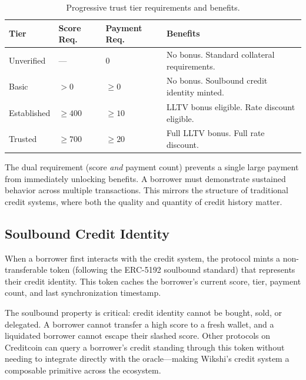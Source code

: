 \documentclass[11pt,a4paper]{article}
\begin{document}
\begin{table}[H]
\centering
{}
\begin{tabularx}{\textwidth}{l C{2.2cm} C{2.2cm} X}
\toprule
\textbf{Tier} & \textbf{Score Req.} & \textbf{Payment Req.} & \textbf{Benefits} \\
\midrule
Unverified & --- & 0 & No bonus. Standard collateral requirements. \\
Basic & $>0$ & $\geq 0$ & No bonus. Soulbound credit identity minted. \\
Established & $\geq 400$ & $\geq 10$ & LLTV bonus eligible. Rate discount eligible. \\
Trusted & $\geq 700$ & $\geq 20$ & Full LLTV bonus. Full rate discount. \\
\bottomrule
\end{tabularx}
\caption{Progressive trust tier requirements and benefits.}
\label{tab:tiers}
\end{table}

The dual requirement (score \emph{and} payment count) prevents a single large payment from immediately unlocking benefits. A borrower must demonstrate sustained behavior across multiple transactions. This mirrors the structure of traditional credit systems, where both the quality and quantity of credit history matter.

\subsection{Soulbound Credit Identity}

When a borrower first interacts with the credit system, the protocol mints a non-transferable token (following the ERC-5192 soulbound standard) that represents their credit identity. This token caches the borrower's current score, tier, payment count, and last synchronization timestamp.

The soulbound property is critical: credit identity cannot be bought, sold, or delegated. A borrower cannot transfer a high score to a fresh wallet, and a liquidated borrower cannot escape their slashed score. Other protocols on Creditcoin can query a borrower's credit standing through this token without needing to integrate directly with the oracle---making Wikshi's credit system a composable primitive across the ecosystem.

\end{document}

